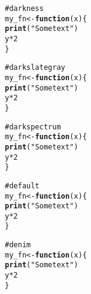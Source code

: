 \documentclass[12pt]{article}\usepackage{graphicx, color}
\makeatletter
\newcommand{\hlfunctioncall}[1]{\textcolor[rgb]{0.188235294117647,0.650980392156863,0.188235294117647}{\textbf{#1}}}%
\newcommand{\hlstring}[1]{\textcolor[rgb]{0.850980392156863,1,0.466666666666667}{#1}}%
\newcommand{\hlcomment}[1]{\textcolor[rgb]{0.533333333333333,0.533333333333333,0.533333333333333}{#1}}%
\newenvironment{kframe}{%
 \def\at@end@of@kframe{}%
 \ifinner\ifhmode%
  \def\at@end@of@kframe{\end{minipage}}%
  \begin{minipage}{\columnwidth}%
 \fi\fi%
 \def\FrameCommand##1{\hskip\@totalleftmargin \hskip-\fboxsep
 \colorbox{shadecolor}{##1}\hskip-\fboxsep
     \hskip-\linewidth \hskip-\@totalleftmargin \hskip\columnwidth}%
 \MakeFramed {\advance\hsize-\width
   \@totalleftmargin\z@ \linewidth\hsize
   \@setminipage}}%
 {\par\unskip\endMakeFramed%
 \at@end@of@kframe}
\newenvironment{knitrout}{}{} %
\makeatother
\begin{document}
\begin{knitrout}
\color{fgcolor}\begin{kframe}
\begin{alltt}
\hlcomment{# darkness}
my_fn <- \hlfunctioncall{function}(x) \{
    \hlfunctioncall{print}(\hlstring{"Some text"})
    y * 2
\}
\end{alltt}
\end{kframe}
\end{knitrout}





\begin{knitrout}
\color{fgcolor}\begin{kframe}
\begin{alltt}
\hlcomment{# darkslategray}
my_fn <- \hlfunctioncall{function}(x) \{
    \hlfunctioncall{print}(\hlstring{"Some text"})
    y * 2
\}
\end{alltt}
\end{kframe}
\end{knitrout}





\begin{knitrout}
\color{fgcolor}\begin{kframe}
\begin{alltt}
\hlcomment{# darkspectrum}
my_fn <- \hlfunctioncall{function}(x) \{
    \hlfunctioncall{print}(\hlstring{"Some text"})
    y * 2
\}
\end{alltt}
\end{kframe}
\end{knitrout}





\begin{knitrout}
\color{fgcolor}\begin{kframe}
\begin{alltt}
\hlcomment{# default}
my_fn <- \hlfunctioncall{function}(x) \{
    \hlfunctioncall{print}(\hlstring{"Some text"})
    y * 2
\}
\end{alltt}
\end{kframe}
\end{knitrout}





\begin{knitrout}
\color{fgcolor}\begin{kframe}
\begin{alltt}
\hlcomment{# denim}
my_fn <- \hlfunctioncall{function}(x) \{
    \hlfunctioncall{print}(\hlstring{"Some text"})
    y * 2
\}
\end{alltt}
\end{kframe}
\end{knitrout}
\end{document}
